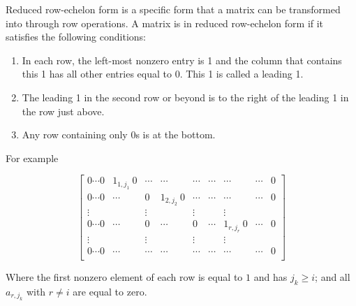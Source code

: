 Reduced row-echelon form is a specific form that a matrix can be transformed into through row operations. A matrix is in reduced row-echelon form if it satisfies the following conditions:

\begin{enumerate}
    \item In each row, the left-most nonzero entry is 1 and the column that contains this 1 has all other entries equal to 0. This 1 is called a leading 1.

    \item The leading 1 in the second row or beyond is to the right of the leading 1 in the row just above.

    \item Any row containing only 0s is at the bottom.
\end{enumerate}

For example

\[
\begin{bmatrix}
0 \cdots 0 & 1_{1,j_1} \ 0 & \cdots & \cdots & \cdots & \cdots & \cdots & \cdots & 0\\
0 \cdots 0 & \cdots  & 0 & 1_{2,j_2} \ 0 & \cdots & \cdots & \cdots & \cdots & 0\\
\vdots&&\vdots&&\vdots&&\vdots\\
0 \cdots 0 & \cdots & 0 & \cdots & 0 & \cdots & 1_{r,j_r} \ 0& \cdots & 0\\
\vdots&&\vdots&&\vdots&&\vdots\\
0 \cdots 0 &\cdots & \cdots & \cdots & \cdots & \cdots & \cdots & \cdots & 0\\
\end{bmatrix}
\]

Where the first nonzero element of each row is equal to $1$ and has $j_k \geq i$; and all $a_{r,j_k}$ with $r \neq i$ are equal to zero.
\\
